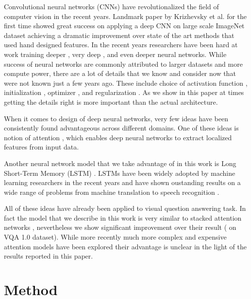 \documentclass[10pt,twocolumn,letterpaper]{article}
\begin{document}
Convolutional neural networks (CNNs) \cite{LeCun2010ConvolutionalNA} have revolutionalized the field of computer vision in the recent years. Landmark paper by Krizhevsky et al. \cite{Krizhevsky2012ImageNetCW} for the first time showed great success on applying a deep CNN on large scale ImageNet \cite{Deng2009ImageNetAL} dataset achieving a dramatic improvement over state of the art methods that used hand designed features. In the recent years researchers have been hard at work training deeper \cite{Szegedy2015GoingDW}, very deep \cite{Szegedy2016RethinkingTI}, and even deeper \cite{He2016DeepRL} neural networks. While success of neural networks are commonly attributed to larger datasets and more compute power, there are a lot of details that we know and consider now that were not known just a few years ago. These include choice of activation function \cite{Nair2010RectifiedLU}, initialization \cite{Glorot2010UnderstandingTD}, optimizer \cite{Kingma2014AdamAM}, and regularization \cite{Hinton2012ImprovingNN}. As we show in this paper at times getting the details right is more important than the actual architecture.

When it comes to design of deep neural networks, very few ideas have been consistently found advantageous across different domains. One of these ideas is notion of attention \cite{Mnih2014RecurrentMO,Vinyals2015ShowAT}, which enables deep neural networks to extract localized features from input data.

Another neural network model that we take advantage of in this work is Long Short-Term Memory (LSTM) \cite{Hochreiter1997LongSM}. LSTMs have been widely adopted by machine learning researchers in the recent years and have shown oustanding results on a wide range of problems from machine translation \cite{Bahdanau2014NeuralMT} to speech recognition \cite{Sak2014LongSM}.

All of these ideas have already been applied to visual question answering task. In fact the model that we describe in this work is very similar to stacked attention networks \cite{Yang2016StackedAN}, nevertheless we show significant improvement over their result ( on VQA 1.0 dataset). While more recently much more complex and expensive attention models have been explored \cite{Fukui2016MultimodalCB,Nam2016DualAN,Lu2016HierarchicalQC} their advantage is unclear in the light of the results reported in this paper. 

\section{Method}
\end{document}
